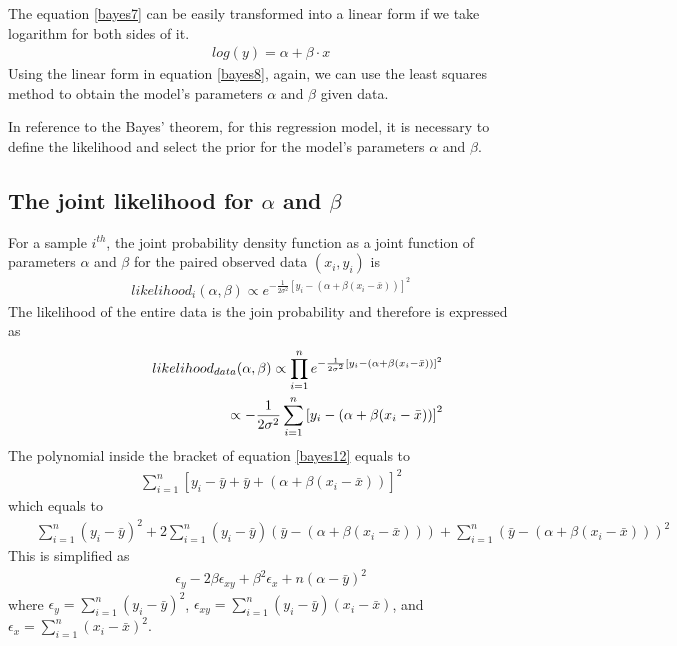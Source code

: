 The equation \eqref{bayes7} can be easily transformed into a linear form if we take logarithm for both sides of it.
\begin{eqnarray}
&& log(y)=\alpha+\beta\cdot x\label{bayes8}
\end{eqnarray}
Using the linear form in equation \eqref{bayes8}, again, we can use the least squares method to obtain the model's parameters $\alpha$ and $\beta$ given data.

In reference to the Bayes' theorem, for this regression model, it is necessary to define the likelihood and select 
the prior for the model's parameters $\alpha$ and $\beta$.
\subsection{The joint likelihood for $\alpha$ and $\beta$} \label{joinlik01}
For a sample $i^{th}$, the joint probability density function as a joint function of parameters $\alpha$ and $\beta$ for the paired observed data $(x_i,y_i)$ is
\begin{eqnarray}
&& likelihood_i(\alpha,\beta) \propto e^{-\frac{1}{2\sigma^2}\left[y_i-(\alpha+\beta(x_i-\bar x))\right]^2}\label{bayes10}
\end{eqnarray}
The likelihood of the entire data is the join probability and therefore is expressed as
\begin{eqnarray}
&& likelihood_{data}(\alpha,\beta) \propto \prod_{i=1}^{n} e^{-\frac{1}{2\sigma^2}\left[y_i-(\alpha+\beta(x_i-\bar x))\right]^2}\label{bayes11} \\
&& \hspace{3.5cm}  \propto -\frac{1}{2\sigma^2} \sum_{i=1}^{n}  \left[y_i-(\alpha+\beta(x_i-\bar x))\right]^2\label{bayes12}
\end{eqnarray}
The polynomial inside the bracket of equation \eqref{bayes12} equals to
\begin{eqnarray}
&& \sum_{i=1}^{n}  \left[y_i-\bar y + \bar y + (\alpha+\beta(x_i-\bar x))\right]^2\label{bayes13}
\end{eqnarray}
which equals to
\begin{eqnarray}
&& \sum_{i=1}^{n}(y_i-\bar y)^2 +2\sum_{i=1}^{n}(y_i-\bar y)(\bar y-(\alpha+\beta(x_i-\bar x)))+ \sum_{i=1}^{n} (\bar y -(\alpha+\beta(x_i-\bar x)))^2 \label{bayes14}
\end{eqnarray}
This is simplified as
\begin{eqnarray}
&& \epsilon_y -2\beta\epsilon_{xy}+\beta^2 \epsilon_x+n(\alpha-\bar y)^2 \label{bayes15}
\end{eqnarray}
where $\epsilon_y=\sum_{i=1}^{n}(y_i-\bar y)^2$, $\epsilon_{xy}=\sum_{i=1}^{n}(y_i-\bar y)(x_i-\bar x)$, and $\epsilon_x=\sum_{i=1}^{n}(x_i-\bar x)^2$.

